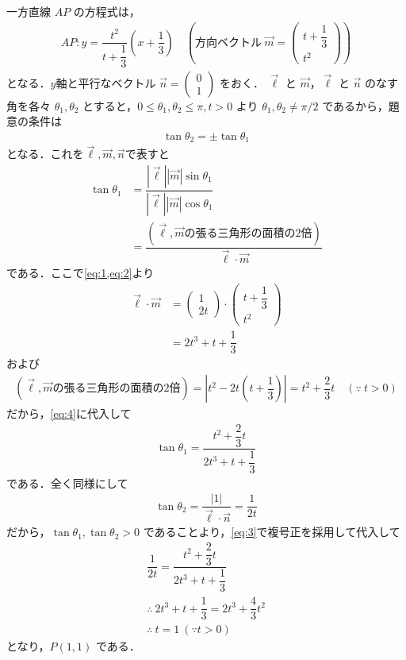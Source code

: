 \documentclass[../../main.tex]{subfiles}
\begin{document}
一方直線 $AP$ の方程式は，
\begin{align}
  AP: y=\dfrac{t^2}{t+\dfrac{1}{3}}\left(x+\dfrac{1}{3}\right) \quad \left(\text{方向ベクトル}\ \vec{m}=
    \begin{pmatrix}t+\dfrac{1}{3}\\t^2
  \end{pmatrix}\right) \label{eq:2}
\end{align}
となる．$y$軸と平行なベクトル $\vec n=
\begin{pmatrix}0\\1
\end{pmatrix}$ をおく．
$\vec\ell$ と $\vec m$，$\vec\ell$ と $\vec n$ のなす角を各々 $\theta_1,\theta_2$ とすると，$0\le\theta_1,\theta_2\le\pi, t>0$ より $\theta_1,\theta_2\ne\pi/2$ であるから，題意の条件は
\begin{align}
  \tan\theta_2=\pm\tan\theta_1 \label{eq:3}
\end{align}
となる．これを$\vec\ell, \vec m, \vec n$で表すと
\begin{align}
  \tan\theta_1
  &=\dfrac{|\vec\ell||\vec m|\sin\theta_1}{|\vec\ell||\vec m|\cos\theta_1} \\
  &=\dfrac{(\text{$\vec\ell, \vec m$の張る三角形の面積の2倍})}{\vec\ell \cdot \vec m} \label{eq:4}
\end{align}
である．ここで\cref{eq:1,eq:2}より
\begin{align}
  \vec\ell \cdot \vec m
  &=
  \begin{pmatrix}1\\2t
  \end{pmatrix} \cdot
  \begin{pmatrix}t+\dfrac{1}{3}\\t^2
  \end{pmatrix} \\
  &= 2t^3+t+\dfrac{1}{3}
\end{align}
および
\begin{align}
  (\text{$\vec\ell, \vec m$の張る三角形の面積の2倍}) = \left|t^2-2t\left(t+\dfrac{1}{3}\right)\right| = t^2+\dfrac{2}{3}t \quad (\because\ t>0)
\end{align}
だから，\cref{eq:4}に代入して
\begin{align}
  \tan\theta_1 = \dfrac{t^2+\dfrac{2}{3}t}{2t^3+t+\dfrac{1}{3}} \label{eq:5}
\end{align}
である．全く同様にして
\begin{align}
  \tan\theta_2=\dfrac{|1|}{\vec\ell\cdot\vec n}=\dfrac{1}{2t}
\end{align}
だから，$\tan\theta_1,\tan\theta_2>0$ であることより，\cref{eq:3}で複号正を採用して代入して
\begin{align}
  \dfrac{1}{2t}=\dfrac{t^2+\dfrac{2}{3}t}{2t^3+t+\dfrac{1}{3}} \\
  \therefore\
  2t^3+t+\dfrac{1}{3}=2t^3+\dfrac{4}{3}t^2 \\
  \therefore\ t=1\ (\because t>0)
\end{align}
となり，$P(1,1)$ である．
\end{document}
